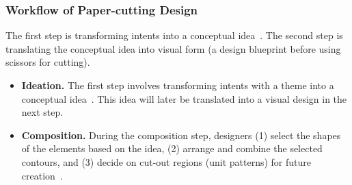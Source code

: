 \subsubsection{Workflow of Paper-cutting Design}
 The first step is transforming intents into a conceptual idea~\cite{Choi:2024:creativeconnect}.
The second step is translating the conceptual idea into visual form (a design blueprint before using scissors for cutting).
\begin{itemize}
\item \textbf{Ideation.} The first step involves transforming intents with a theme into a conceptual idea~\cite{Li:1998:monopapercutting}. 
 This idea will later be translated into a visual design in the next step.
\item \textbf{Composition.} During the composition step, designers (1) select the shapes of the elements based on the idea, (2) arrange and combine the selected contours, and (3) decide on cut-out regions (unit patterns) for future creation~\cite{Lin:1974:howtopapercutting, Li:2011:PatternandDesign}.
\end{itemize}

